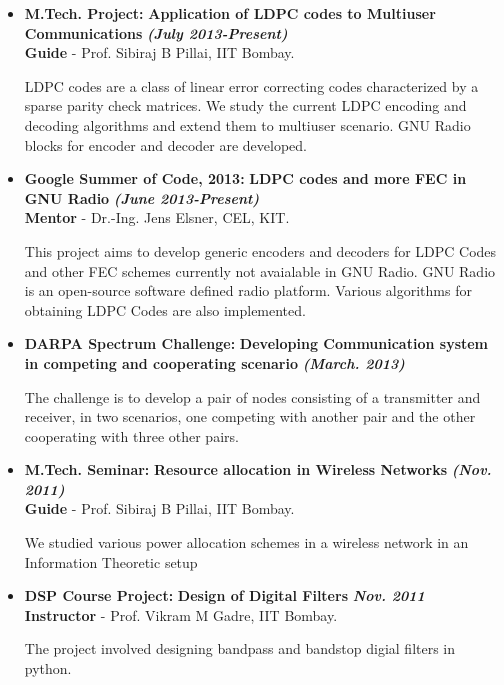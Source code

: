 \documentclass[a4paper,10pt]{article}
\begin{document}
 \begin{itemize}
 \setlength{\itemsep}{1pt}
 
  \item \textbf{M.Tech. Project:} \textbf{Application of LDPC codes to Multiuser Communications} \textbf \emph{(July 2013-Present)} \\
        {\textbf{Guide} - Prof. Sibiraj B Pillai, IIT Bombay.}

LDPC codes are a class of linear error correcting codes characterized by a sparse parity check matrices. 
We study the current LDPC encoding and decoding algorithms and extend them to multiuser scenario.
GNU Radio blocks for encoder and decoder are developed.

 \item \textbf{Google Summer of Code, 2013:} \textbf{LDPC codes and more FEC in GNU Radio}  \textbf \emph{(June 2013-Present)}\\
        {\textbf{Mentor} - Dr.-Ing. Jens Elsner, CEL, KIT.}

        This project aims to develop generic encoders and decoders for LDPC Codes and other FEC schemes currently not avaialable in
        GNU Radio. GNU Radio is an open-source software defined radio platform. Various algorithms for obtaining LDPC Codes are 
        also implemented.
        
\item \textbf{DARPA Spectrum Challenge:} \textbf{Developing Communication system in competing and cooperating scenario}
\textbf \emph{(March. 2013)}

The challenge is to develop a pair of nodes consisting of a transmitter and receiver, in two scenarios, one competing with
another pair and the other cooperating with three other pairs.

 \item \textbf{M.Tech. Seminar:} \textbf{Resource allocation in Wireless Networks}  \textbf \emph{(Nov. 2011)}\\
        {\textbf{Guide} - Prof. Sibiraj B Pillai, IIT Bombay.}

       We studied various power allocation schemes in a wireless network in an Information Theoretic setup
       
 \item \textbf{DSP Course Project:} \textbf{Design of Digital Filters} \textbf \emph{Nov. 2011}\\
	{\textbf{Instructor} - Prof. Vikram M Gadre, IIT Bombay. }
	
	The project involved designing bandpass and bandstop digial filters in python.
	

\end{itemize}
\end{document}
